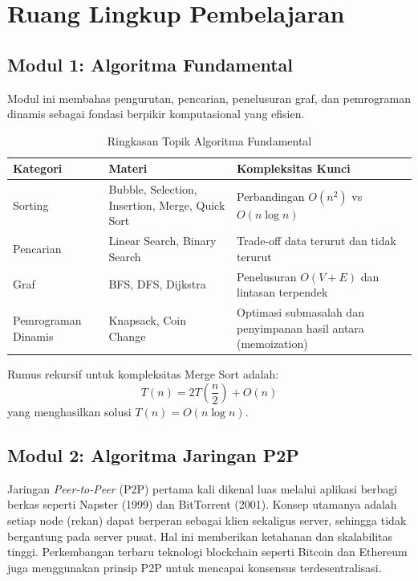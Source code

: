 \documentclass{article}
\begin{document}
\section{Ruang Lingkup Pembelajaran}
\subsection{Modul 1: Algoritma Fundamental}
Modul ini membahas pengurutan, pencarian, penelusuran graf, dan pemrograman dinamis sebagai fondasi
berpikir komputasional yang efisien.

\begin{table}[H]
\centering
\caption{Ringkasan Topik Algoritma Fundamental}
\begin{tabularx}{\linewidth}{>{\raggedright\arraybackslash}p{3cm} >{\raggedright\arraybackslash}X >{\raggedright\arraybackslash}p{3cm}}
\toprule
Kategori & Materi & Kompleksitas Kunci \\
\midrule
Sorting & Bubble, Selection, Insertion, Merge, Quick Sort & Perbandingan $O(n^2)$ vs $O(n \log n)$ \\
Pencarian & Linear Search, Binary Search & Trade-off data terurut dan tidak terurut \\
Graf & BFS, DFS, Dijkstra & Penelusuran $O(V+E)$ dan lintasan terpendek \\
Pemrograman Dinamis & Knapsack, Coin Change & Optimasi submasalah dan penyimpanan hasil antara (memoization) \\
\bottomrule
\end{tabularx}
\end{table}

Rumus rekursif untuk kompleksitas Merge Sort adalah:
\[
T(n) = 2T\left(\frac{n}{2}\right) + O(n)
\]
yang menghasilkan solusi \(T(n) = O(n \log n)\).

\subsection{Modul 2: Algoritma Jaringan P2P}
Jaringan \textit{Peer-to-Peer} (P2P) pertama kali dikenal luas melalui aplikasi berbagi berkas
seperti Napster (1999) dan BitTorrent (2001). Konsep utamanya adalah setiap node (rekan)
dapat berperan sebagai klien sekaligus server, sehingga tidak bergantung pada server pusat.
Hal ini memberikan ketahanan dan skalabilitas tinggi. Perkembangan terbaru teknologi blockchain
seperti Bitcoin dan Ethereum juga menggunakan prinsip P2P untuk mencapai konsensus terdesentralisasi.
\end{document}
